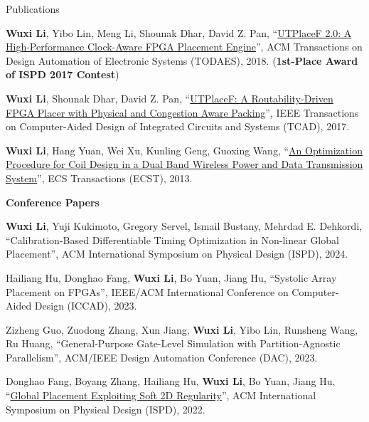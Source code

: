 \begin{rSection}{Publications}
\begin{description}[font=\normalfont]
\item[{[J3]}]{
    \textbf{Wuxi Li}, Yibo Lin, Meng Li, Shounak Dhar, David Z. Pan,
    ``\href{https://dl.acm.org/citation.cfm?id=3174849}{UTPlaceF 2.0: A High-Performance Clock-Aware FPGA Placement Engine}'',
    ACM Transactions on Design Automation of Electronic Systems (TODAES), 2018.
    (\textbf{1st-Place Award of ISPD 2017 Contest})
}

\item[{[J2]}]{
    \textbf{Wuxi Li}, Shounak Dhar, David Z. Pan,
    ``\href{http://ieeexplore.ieee.org/document/7984833/}{UTPlaceF: A Routability-Driven FPGA Placer with Physical and Congestion Aware Packing}'',
    IEEE Transactions on Computer-Aided Design of Integrated Circuits and Systems (TCAD), 2017.
}

\item[{[J1]}]{
    \textbf{Wuxi Li}, Hang Yuan, Wei Xu, Kunling Geng, Guoxing Wang,
    ``\href{http://ecst.ecsdl.org/content/52/1/1091.short}{An Optimization Procedure for Coil Design in a Dual Band Wireless Power and Data Transmission System}'',
    ECS Transactions (ECST), 2013.
}

\end{description}

\textbf{Conference Papers}
\begin{description}[font=\normalfont]
\item[{[C15]}]{
    \textbf{Wuxi Li}, Yuji Kukimoto, Gregory Servel, Ismail Bustany, Mehrdad E. Dehkordi,
    ``Calibration-Based Differentiable Timing Optimization in Non-linear Global Placement'',
    ACM International Symposium on Physical Design (ISPD), 2024.
}

\item[{[C14]}]{
    Hailiang Hu, Donghao Fang, \textbf{Wuxi Li}, Bo Yuan, Jiang Hu,
    ``Systolic Array Placement on FPGAs'',
    IEEE/ACM International Conference on Computer-Aided Design (ICCAD), 2023.
}

\item[{[C13]}]{
    Zizheng Guo, Zuodong Zhang, Xun Jiang, \textbf{Wuxi Li}, Yibo Lin, Runsheng Wang, Ru Huang,
    ``General-Purpose Gate-Level Simulation with Partition-Agnostic Parallelism'',
    ACM/IEEE Design Automation Conference (DAC), 2023.
}

\item[{[C12]}]{
    Donghao Fang, Boyang Zhang, Hailiang Hu, \textbf{Wuxi Li}, Bo Yuan, Jiang Hu,
    ``\href{https://dl.acm.org/doi/10.1145/3505170.3506723}{Global Placement Exploiting Soft 2D Regularity}'',
    ACM International Symposium on Physical Design (ISPD), 2022.
}


\end{description}
\end{rSection}
